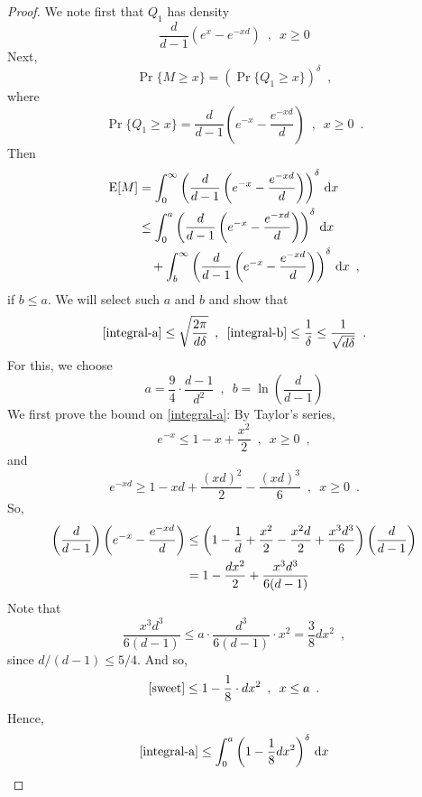 \documentclass{patmorin}
\begin{document}
\begin{proof}
   We note first that $Q_1$ has density
   \[
        \frac{d}{d-1}\left(e^x - e^{-xd}\right) \enspace , \enspace x\ge 0
   \]
   Next,
   \[
        \Pr\{M \ge x\} = \left(\Pr\{Q_1\ge x\}\right)^{\delta} \enspace ,
   \]
   where 
   \[
        \Pr\{Q_1\ge x\} = \frac{d}{d-1}\left(e^{-x}-\frac{e^{-xd}}{d}\right) \enspace ,\enspace x\ge 0 \enspace .
   \]
   Then
   \begin{align}
       \E[M] 
        & = \int_0^\infty \left(\frac{d}{d-1}\left(e^{-x}-\frac{e^{-xd}}{d}\right)\right)^\delta \,\mathrm{d}x \notag \\ 
        & \le
          \int_0^a \left(\frac{d}{d-1}\left(e^{-x}-\frac{e^{-xd}}{d}\right)\right)^\delta \,\mathrm{d}x  \eqlabel{integral-a} \\
          & \quad + \int_b^\infty \left(\frac{d}{d-1}\left(e^{-x}-\frac{e^{-xd}}{d}\right)\right)^\delta \,\mathrm{d}x \enspace , \eqlabel{integral-b}
   \end{align}
   if $b\le a$.  We will select such $a$ and $b$ and show that 
   \[  \eqref{integral-a} \le \sqrt{\frac{2\pi}{d\delta}} \enspace , \enspace
       \eqref{integral-b} \le \frac{1}{\delta} \le \frac{1}{\sqrt{d\delta}} \enspace .
   \]
   For this, we choose 
   \[
        a = \frac{9}{4}\cdot\frac{d-1}{d^2} \enspace, \enspace b=\ln\left(\frac{d}{d-1}\right)
   \]
   We first prove the bound on \eqref{integral-a}:  By Taylor's series, 
   \[   e^{-x} \le 1 - x + \frac{x^2}{2} \enspace , \enspace x\ge 0 \enspace , \]
   and
   \[   e^{-xd} \ge 1 - xd + \frac{(xd)^2}{2} - \frac{(xd)^3}{6}\enspace , \enspace x\ge 0 \enspace . \]
   So,
   \begin{align}
       \left(\frac{d}{d-1}\right)\left(e^{-x}-\frac{e^{-xd}}{d}\right)
       & \le 
       \left(
         1-\frac{1}{d}+\frac{x^2}{2}-\frac{x^2d}{2}+\frac{x^3d^3}{6}
       \right) \left(\frac{d}{d-1}\right) \notag \\
       & = 1-\frac{dx^2}{2}+\frac{x^3d^3}{6(d-1)}  \eqlabel{sweet}
   \end{align}
   Note that
   \[
         \frac{x^3d^3}{6(d-1)} \le a\cdot \frac{d^3}{6(d-1)}\cdot x^2
      = \frac{3}{8}dx^2 
      \enspace ,
   \] 
   since $d/(d-1) \le 5/4$. And so,
   \[
      \eqref{sweet} \le 1-\frac{1}{8}\cdot dx^2 \enspace , \enspace x \le a \enspace .
   \]
   Hence,
   \begin{align*}
      \eqref{integral-a} 
        & \le \int_0^a\left(1-\frac{1}{8}dx^2\right)^\delta \, \mathrm{d}x \\

\end{align*}
\end{proof}
\end{document}
